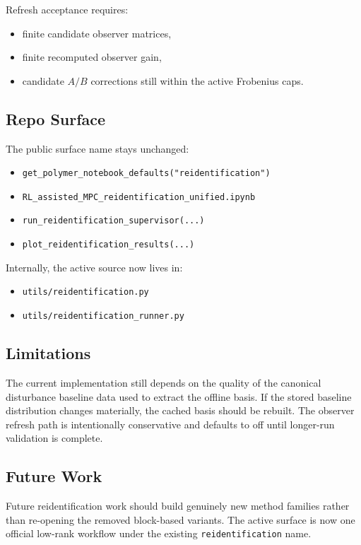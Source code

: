 Refresh acceptance requires:
\begin{itemize}
    \item finite candidate observer matrices,
    \item finite recomputed observer gain,
    \item candidate $A/B$ corrections still within the active Frobenius caps.
\end{itemize}

\subsection{Repo Surface}

The public surface name stays unchanged:
\begin{itemize}
    \item \texttt{get\_polymer\_notebook\_defaults("reidentification")}
    \item \texttt{RL\_assisted\_MPC\_reidentification\_unified.ipynb}
    \item \texttt{run\_reidentification\_supervisor(...)}
    \item \texttt{plot\_reidentification\_results(...)}
\end{itemize}

Internally, the active source now lives in:
\begin{itemize}
    \item \texttt{utils/reidentification.py}
    \item \texttt{utils/reidentification\_runner.py}
\end{itemize}

\subsection{Limitations}

The current implementation still depends on the quality of the canonical disturbance baseline data used to extract the offline basis. If the stored baseline distribution changes materially, the cached basis should be rebuilt. The observer refresh path is intentionally conservative and defaults to off until longer-run validation is complete.

\subsection{Future Work}

Future reidentification work should build genuinely new method families rather than re-opening the removed block-based variants. The active surface is now one official low-rank workflow under the existing \texttt{reidentification} name.
